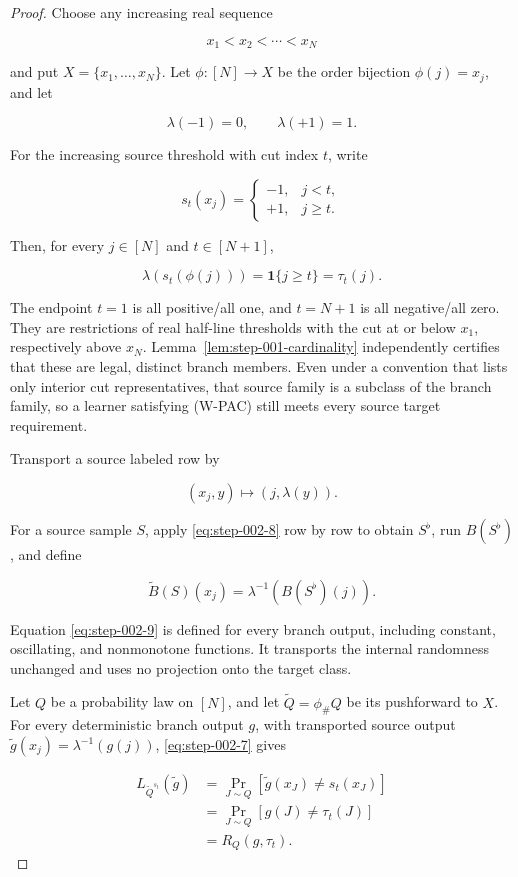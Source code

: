 \begin{proof}
Choose any increasing real sequence

\[
x_1<x_2<\cdots<x_N
\]

and put \(X=\{x_1,\ldots,x_N\}\). Let \(\phi:[N]\to X\) be the order bijection \(\phi(j)=x_j\), and let

\[
\lambda(-1)=0,\qquad \lambda(+1)=1.
\]

For the increasing source threshold with cut index \(t\), write

\[
s_t(x_j)=
\begin{cases}
-1,&j<t,\\
+1,&j\ge t.
\end{cases}
\]

Then, for every \(j\in[N]\) and \(t\in[N+1]\),

\[
\lambda(s_t(\phi(j)))=\mathbf1\{j\ge t\}=\tau_t(j).
\tag{S2.7}\label{eq:step-002-7}
\]

The endpoint \(t=1\) is all positive/all one, and \(t=N+1\) is all negative/all zero. They are restrictions of real half-line thresholds with the cut at or below \(x_1\), respectively above \(x_N\). Lemma~\ref{lem:step-001-cardinality} independently certifies that these are legal, distinct branch members. Even under a convention that lists only interior cut representatives, that source family is a subclass of the branch family, so a learner satisfying (W-PAC) still meets every source target requirement.

Transport a source labeled row by

\[
(x_j,y)\longmapsto(j,\lambda(y)).
\tag{S2.8}\label{eq:step-002-8}
\]

For a source sample \(S\), apply \eqref{eq:step-002-8} row by row to obtain \(S^{\flat}\), run \(B(S^{\flat})\), and define

\[
\widetilde B(S)(x_j)
=\lambda^{-1}\!\left(B(S^{\flat})(j)\right).
\tag{S2.9}\label{eq:step-002-9}
\]

Equation \eqref{eq:step-002-9} is defined for every branch output, including constant, oscillating, and nonmonotone functions. It transports the internal randomness unchanged and uses no projection onto the target class.

Let \(Q\) be a probability law on \([N]\), and let \(\widetilde Q=\phi_{\#}Q\) be its pushforward to \(X\). For every deterministic branch output \(g\), with transported source output \(\widetilde g(x_j)=\lambda^{-1}(g(j))\), \eqref{eq:step-002-7} gives

\[
\begin{aligned}
L_{\widetilde Q^{s_t}}(\widetilde g)
&=\Pr_{J\sim Q}
   [\widetilde g(x_J)\ne s_t(x_J)]\\
&=\Pr_{J\sim Q}[g(J)\ne\tau_t(J)]\\
&=R_Q(g,\tau_t).
\end{aligned}
\tag{S2.10}\label{eq:step-002-10}
\]


\end{proof}

